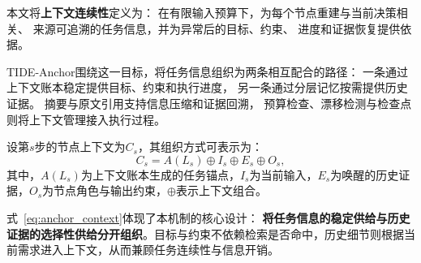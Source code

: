 本文将\textbf{上下文连续性}定义为：
在有限输入预算下，为每个节点重建与当前决策相关、
来源可追溯的任务信息，并为异常后的目标、约束、
进度和证据恢复提供依据。

TIDE-Anchor围绕这一目标，将任务信息组织为两条相互配合的路径：
一条通过上下文账本稳定提供目标、约束和执行进度，
另一条通过分层记忆按需提供历史证据。
摘要与原文引用支持信息压缩和证据回溯，
预算检查、漂移检测与检查点则将上下文管理接入执行过程。





设第$s$步的节点上下文为$C_s$，其组织方式可表示为：
\begin{equation}
    C_s=A(L_s)\oplus I_s\oplus E_s\oplus O_s,
    \label{eq:anchor_context}
\end{equation}
其中，$A(L_s)$为上下文账本生成的任务锚点，$I_s$为当前输入，$E_s$为唤醒的历史证据，$O_s$为节点角色与输出约束，$\oplus$表示上下文组合。

式~\eqref{eq:anchor_context}体现了本机制的核心设计：
\textbf{将任务信息的稳定供给与历史证据的选择性供给分开组织}。目标与约束不依赖检索是否命中，历史细节则根据当前需求进入上下文，从而兼顾任务连续性与信息开销。





